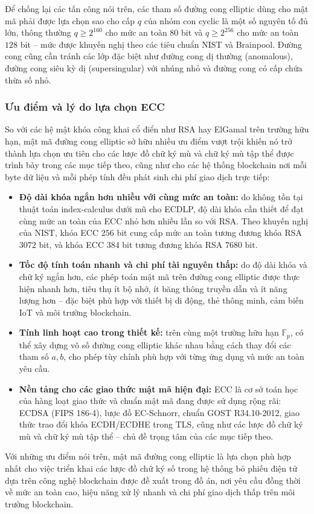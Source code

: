 Để chống lại các tấn công nói trên, các tham số đường cong elliptic dùng cho mật mã phải được lựa chọn sao cho cấp $q$ của nhóm con cyclic là một số nguyên tố đủ lớn, thông thường $q \geq 2^{160}$ cho mức an toàn $80$ bit và $q \geq 2^{256}$ cho mức an toàn $128$ bit -- mức được khuyến nghị theo các tiêu chuẩn NIST và Brainpool. Đường cong cũng cần tránh các lớp đặc biệt như đường cong dị thường (anomalous), đường cong siêu kỳ dị (supersingular) với nhúng nhỏ và đường cong có cấp chứa thừa số nhỏ.

\subsubsection{Ưu điểm và lý do lựa chọn ECC}

So với các hệ mật khóa công khai cổ điển như RSA hay ElGamal trên trường hữu hạn, mật mã đường cong elliptic sở hữu nhiều ưu điểm vượt trội khiến nó trở thành lựa chọn ưu tiên cho các lược đồ chữ ký mù và chữ ký mù tập thể được trình bày trong các mục tiếp theo, cũng như cho các hệ thống blockchain nơi mỗi byte dữ liệu và mỗi phép tính đều phát sinh chi phí giao dịch trực tiếp:

\begin{itemize}
    \item \textbf{Độ dài khóa ngắn hơn nhiều với cùng mức an toàn:} do không tồn tại thuật toán index-calculus dưới mũ cho ECDLP, độ dài khóa cần thiết để đạt cùng mức an toàn của ECC nhỏ hơn nhiều lần so với RSA. Theo khuyến nghị của NIST, khóa ECC $256$ bit cung cấp mức an toàn tương đương khóa RSA $3072$ bit, và khóa ECC $384$ bit tương đương khóa RSA $7680$ bit.

    \item \textbf{Tốc độ tính toán nhanh và chi phí tài nguyên thấp:} do độ dài khóa và chữ ký ngắn hơn, các phép toán mật mã trên đường cong elliptic được thực hiện nhanh hơn, tiêu thụ ít bộ nhớ, ít băng thông truyền dẫn và ít năng lượng hơn -- đặc biệt phù hợp với thiết bị di động, thẻ thông minh, cảm biến IoT và môi trường blockchain.

    \item \textbf{Tính linh hoạt cao trong thiết kế:} trên cùng một trường hữu hạn $\mathbb{F}_p$, có thể xây dựng vô số đường cong elliptic khác nhau bằng cách thay đổi các tham số $a, b$, cho phép tùy chỉnh phù hợp với từng ứng dụng và mức an toàn yêu cầu.

    \item \textbf{Nền tảng cho các giao thức mật mã hiện đại:} ECC là cơ sở toán học của hàng loạt giao thức và chuẩn mật mã đang được sử dụng rộng rãi: ECDSA (FIPS 186-4), lược đồ EC-Schnorr, chuẩn GOST R34.10-2012, giao thức trao đổi khóa ECDH/ECDHE trong TLS, cũng như các lược đồ chữ ký mù và chữ ký mù tập thể -- chủ đề trọng tâm của các mục tiếp theo.
\end{itemize}

Với những ưu điểm nói trên, mật mã đường cong elliptic là lựa chọn phù hợp nhất cho việc triển khai các lược đồ chữ ký số trong hệ thống bỏ phiếu điện tử dựa trên công nghệ blockchain được đề xuất trong đồ án, nơi yêu cầu đồng thời về mức an toàn cao, hiệu năng xử lý nhanh và chi phí giao dịch thấp trên môi trường blockchain.
